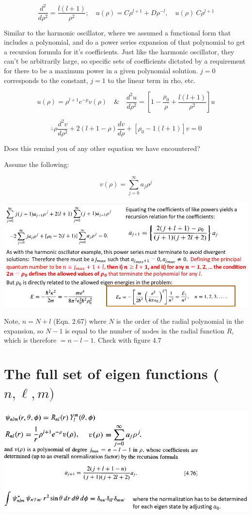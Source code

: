 \documentclass{article}
\begin{document}
$$\frac{d^2}{d \rho^2} = \frac{l(l+1)}{\rho^2}; \quad u(\rho) = C \rho^{l+1} + D \rho^{- l}, \quad u(\rho) ~ C \rho^{l+1}$$

Similar to the harmonic oscillator, where we assumed a functional form that includes a polynomial, and do a power series expansion of that polynomial to get a recursion formula for it’s coefficients. Just like the harmonic oscillator, they can’t be arbitrarily large, so specific sets of coefficients dictated by a requirement for there to be a maximum power in a given polynomial solution.  $j=0$ corresponds to the constant, $j=1$ to the linear term in rho, etc.


$$u(\rho) = \rho^{l+1} e^{-p} v(\rho) \quad \& \quad \frac{d^2 u}{d \rho^2} = \left[ 1 - \frac{\rho_0}{\rho} + \frac{l(l+1)}{\rho^2} \right] u$$

$$\therefore \rho \frac{d^2 v}{d \rho^2} + 2(l+1-\rho) \frac{dv}{d \rho} + \left[ \rho_0 - 1(l+1) \right] v = 0$$

Does this remind you of any other equation we have encountered?

Assume the following:

$$v(\rho) = \sum_{j=0}^\infty a_j \rho^j$$

\includegraphics[width = 0.9 \textwidth]{Lecture20/4.png}

Note, $n=N+l$ (Eqn. 2.67) where $N$ is the order of the radial polynomial in the expansion, so $N-1$ is equal to the number of nodes in the radial function $R$, which is therefore $= n-l-1$. Check with figure 4.7

\section{The full set of eigen functions ($n, \ell, m)$}

\includegraphics[width = 0.9 \textwidth]{Lecture20/5.png}
\end{document}
